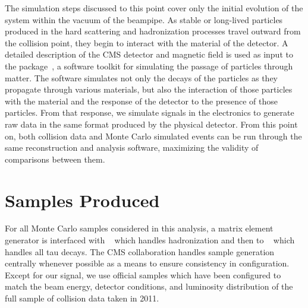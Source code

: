 The simulation steps discussed to this point cover only the initial evolution of the system within the vacuum of the beampipe.  As stable or long-lived particles produced in the hard scattering and hadronization processes travel outward from the collision point, they begin to interact with the material of the detector.  A detailed description of the CMS detector and magnetic field is used as input to the \GEANTfour package~\cite{Agostinelli2003250,Allison1610988}, a software toolkit for simulating the passage of particles through matter.  The software simulates not only the decays of the particles as they propagate through various materials, but also the interaction of those particles with the material and the response of the detector to the presence of those particles.  From that response, we simulate signals in the electronics to generate raw data in the same format produced by the physical detector.  From this point on, both collision data and Monte Carlo simulated events can be run through the same reconstruction and analysis software, maximizing the validity of comparisons between them. 


\section{Samples Produced}
\label{sec:mc-samples}
For all Monte Carlo samples considered in this analysis, a matrix element generator is interfaced with \PYTHIA~\cite{PYTHIA} which handles hadronization and then to \TAUOLA~\cite{Was:2000st} which handles all tau decays.  The CMS collaboration handles sample generation centrally whenever possible as a means to ensure consistency in configuration.  Except for our \wprime signal, we use official samples which have been configured to match the beam energy, detector conditions, and luminosity distribution of the full sample of collision data taken in 2011.


